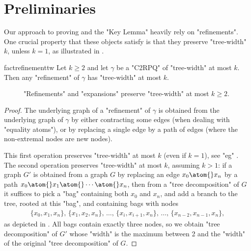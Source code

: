 \section{\AP{}Preliminaries}
\label{sec:prelim}

Our approach to proving 
and the "Key Lemma" heavily rely on "refinements". One crucial property
that these objects satisfy is that they preserve "tree-width" $k$, unless $k=1$,
as illustrated in .

\begin{restatable}{fact}{refinementtw}
    \AP\label{fact:refinement-tw}
    Let $k \geq 2$ and let $\gamma$ be a "C2RPQ" of "tree-width" at most $k$.
    Then any "refinement" of $\gamma$ has "tree-width" at most $k$.
\end{restatable}

\begin{figure}
    \centering
	\hfill
    \caption{\AP\label{fig:tree-decompositon-expansion} "Refinements" and "expansions" preserve "tree-width" at
	most $k\geq 2$.
    }
\end{figure}
\begin{proof}
    The underlying graph of a "refinement" of $\gamma$ is obtained from the underlying graph
    of $\gamma$ by either contracting some edges (when dealing with "equality atoms"),
	or by replacing
    a single edge by a path of edges (where the non-extremal nodes are new nodes).

	This first operation preserves "tree-width" at most $k$ (even if $k = 1$),
    see "eg" \cite[Lemma 16]{Bodlaender1998Arboretum}. The second operation
    preserves "tree-width" at most $k$, assuming $k > 1$: if a graph $G'$
    is obtained from a graph $G$ by replacing an edge $x_0 \atom{} x_n$
    by a path $x_0 \atom{} x_1 \atom{} \cdots \atom{} x_n$, then
    from a "tree decomposition" of $G$ it suffices to pick a "bag" containing
    both $x_0$ and $x_n$, and add a branch to the tree, rooted at this "bag",
    and containing bags with nodes
    \begin{align*}
        \{x_0,x_1,x_n\},\,
        \{x_1,x_2,x_n\},\,
		\hdots,\,
        \{x_i,x_{i+1},x_n\},\,
		\hdots,\,
        \{x_{n-2},x_{n-1},x_n\},
    \end{align*}
	as depicted in .
    All bags contain exactly three nodes, so we obtain "tree decomposition" of
    $G'$ whose "width" is the maximum between 2 and the "width" of the original
    "tree decomposition" of $G$.
\end{proof}

